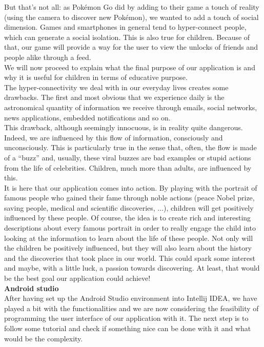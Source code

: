\documentclass[12pt]{scrartcl}
\begin{document}
	But that’s not all: as Pokémon Go did by adding to their game a touch of reality (using the camera to discover new Pokémon), we wanted to add a touch of social dimension. Games and smartphones in general tend to hyper-connect people, which can generate a social isolation. This is also true for children. Because of that, our game will provide a way for the user to view the unlocks of friends and people alike through a feed.\\

	We will now proceed to explain what the final purpose of our application is and why it is useful for children in terms of educative purpose.\\ 

	The hyper-connectivity we deal with in our everyday lives creates some drawbacks. The first and most obvious that we experience daily is the astronomical quantity of information we receive through emails, social networks, news applications, embedded notifications and so on.\\ This drawback, although seemingly innocuous, is in reality quite dangerous. Indeed, we are influenced by this flow of information, consciously and unconsciously. This is particularly true in the sense that, often, the flow is made of a ``buzz” and, usually, these viral buzzes are bad examples or stupid actions from the life of celebrities. Children, much more than adults, are influenced by this.\\

	It is here that our application comes into action. By playing with the portrait of famous people who gained their fame through noble actions (peace Nobel prize, saving people, medical and scientific discoveries, ...), children will get positively influenced by these people. Of course, the idea is to create rich and interesting descriptions about every famous portrait in order to really engage the child into looking at the information to learn about the life of these people. Not only will the children be positively influenced, but they will also learn about the history and the discoveries that took place in our world. This could spark some interest and maybe, with a little luck, a passion towards discovering. At least, that would be the best goal our application could achieve!\\


	\textbf{Android studio}\\

	After having set up the Android Studio environment into Intellij IDEA, we have played a bit with the functionalities and we are now considering the feasibility of programming the user interface of our application with it. The next step is to follow some tutorial and check if something nice can be done with it and what would be the complexity.\\
\end{document}
